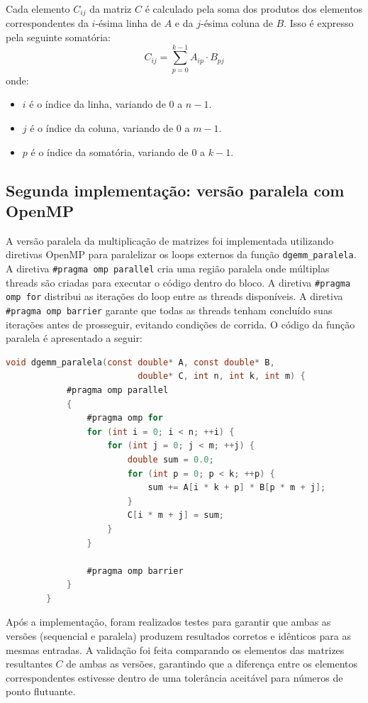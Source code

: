 \documentclass[12pt, a4paper]{article}
\begin{document}
	Cada elemento $C_{ij}$ da matriz $C$ é calculado pela soma dos produtos dos elementos correspondentes da $i$-ésima linha de $A$ e da $j$-ésima coluna de $B$. Isso é expresso pela seguinte somatória:
	\[
		C_{ij}= \sum_{p=0}^{k-1}A_{ip}\cdot B_{pj}
	\]
	onde:
	\begin{itemize}
		\item $i$ é o índice da linha, variando de $0$ a $n-1$.

		\item $j$ é o índice da coluna, variando de $0$ a $m-1$.

		\item $p$ é o índice da somatória, variando de $0$ a $k-1$.
	\end{itemize}

	\subsection{Segunda implementação: versão paralela com OpenMP}

	A versão paralela da multiplicação de matrizes foi implementada utilizando diretivas OpenMP para paralelizar os loops externos da função \texttt{dgemm\_paralela}. A diretiva \texttt{\#pragma omp parallel} cria uma região paralela onde múltiplas threads são criadas para executar o código dentro do bloco. A diretiva \texttt{\#pragma omp for} distribui as iterações do loop entre as threads disponíveis. A diretiva \texttt{\#pragma omp barrier} garante que todas as threads tenham concluído suas iterações antes de prosseguir, evitando condições de corrida. O código da função paralela é apresentado a seguir:

	\begin{lstlisting}[language=C]
		void dgemm_paralela(const double* A, const double* B, 
						  double* C, int n, int k, int m) {
			#pragma omp parallel
			{
				#pragma omp for
				for (int i = 0; i < n; ++i) {
					for (int j = 0; j < m; ++j) {
						double sum = 0.0;
						for (int p = 0; p < k; ++p) {
							sum += A[i * k + p] * B[p * m + j];
						}
						C[i * m + j] = sum;
					}
				}

				#pragma omp barrier
			}
		}
	\end{lstlisting}

	Após a implementação, foram realizados testes para garantir que ambas as versões (sequencial e paralela) produzem resultados corretos e idênticos para as mesmas entradas. A validação foi feita comparando os elementos das matrizes resultantes $C$ de ambas as versões, garantindo que a diferença entre os elementos correspondentes estivesse dentro de uma tolerância aceitável para números de ponto flutuante.
\end{document}
